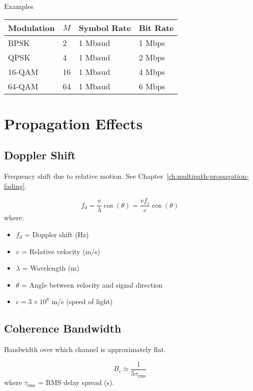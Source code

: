 \begin{calloutbox}{Examples}
\begin{tabular}{@{}llll@{}}
\toprule
Modulation & $M$ & Symbol Rate & Bit Rate \\
\midrule
BPSK & 2 & 1 Mbaud & 1 Mbps \\
QPSK & 4 & 1 Mbaud & 2 Mbps \\
16-QAM & 16 & 1 Mbaud & 4 Mbps \\
64-QAM & 64 & 1 Mbaud & 6 Mbps \\
\bottomrule
\end{tabular}
\end{calloutbox}

\section{Propagation Effects}
\label{sec:propagation-effects}

\subsection{Doppler Shift}
\label{sec:doppler-shift}

Frequency shift due to relative motion. See Chapter~\ref{ch:multipath-propagation-fading}.

\begin{equation}
f_d = \frac{v}{\lambda} \cos(\theta) = \frac{vf_c}{c} \cos(\theta)
\label{eq:doppler}
\end{equation}
where:
\begin{itemize}
\item $f_d$ = Doppler shift (Hz)
\item $v$ = Relative velocity (m/s)
\item $\lambda$ = Wavelength (m)
\item $\theta$ = Angle between velocity and signal direction
\item $c = 3 \times 10^8$ m/s (speed of light)
\end{itemize}

\subsection{Coherence Bandwidth}
\label{sec:coherence-bandwidth}

Bandwidth over which channel is approximately flat.

\begin{equation}
B_c \approx \frac{1}{5\tau_{\text{rms}}}
\label{eq:coherence-bandwidth}
\end{equation}
where $\tau_{\text{rms}}$ = RMS delay spread (s).

